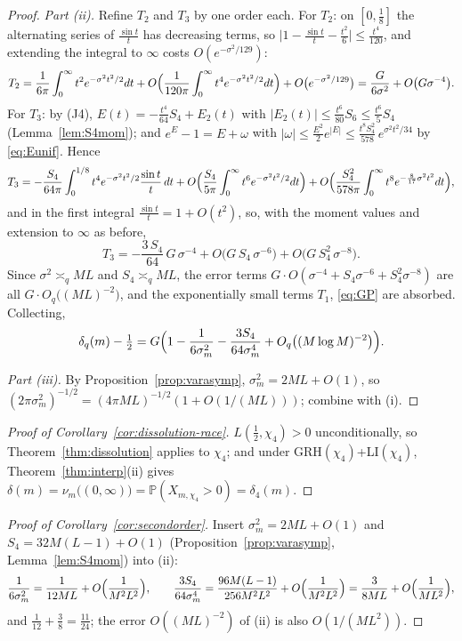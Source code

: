 \documentclass[11pt]{article}
\begin{document}
\begin{proof}
\emph{Part (ii).} Refine $T_2$ and $T_3$ by one order each. For
$T_2$: on $[0,\tfrac18]$ the alternating series of $\frac{\sin t}t$
has decreasing terms, so
$\bigl|1-\frac{\sin t}t-\frac{t^2}6\bigr|\le\frac{t^4}{120}$, and
extending the integral to $\infty$ costs $O(e^{-\sigma^2/129})$:
\[
T_2=\frac1{6\pi}\int_0^{\infty}t^2e^{-\sigma^2t^2/2}dt
+O\Bigl(\frac1{120\pi}\int_0^\infty t^4e^{-\sigma^2t^2/2}dt\Bigr)
+O\bigl(e^{-\sigma^2/129}\bigr)
=\frac{G}{6\sigma^2}+O\bigl(G\sigma^{-4}\bigr).
\]
For $T_3$: by (J4), $E(t)=-\frac{t^4}{64}S_4+E_2(t)$ with
$|E_2(t)|\le\frac{t^6}{80}S_6\le\frac{t^6}{5}S_4$
(Lemma~\ref{lem:S4mom}); and $e^E-1=E+\omega$ with
$|\omega|\le\frac{E^2}2e^{|E|}
\le\frac{t^8S_4^2}{578}\,e^{\sigma^2t^2/34}$ by \eqref{eq:Eunif}.
Hence
\[
T_3=-\frac{S_4}{64\pi}\int_0^{1/8}t^4e^{-\sigma^2t^2/2}
\frac{\sin t}t\,dt
+O\Bigl(\frac{S_4}{5\pi}\int_0^\infty
t^6e^{-\sigma^2t^2/2}dt\Bigr)
+O\Bigl(\frac{S_4^2}{578\pi}\int_0^\infty
t^8e^{-\frac{8}{17}\sigma^2t^2}dt\Bigr),
\]
and in the first integral $\frac{\sin t}t=1+O(t^2)$, so, with the
moment values and extension to $\infty$ as before,
\[
T_3=-\frac{3\,S_4}{64}\,G\,\sigma^{-4}
+O\bigl(G\,S_4\,\sigma^{-6}\bigr)
+O\bigl(G\,S_4^2\,\sigma^{-8}\bigr).
\]
Since $\sigma^2\asymp_qML$ and $S_4\asymp_qML$, the error terms
$G\cdot O(\sigma^{-4}+S_4\sigma^{-6}+S_4^2\sigma^{-8})$ are all
$G\cdot O_q\bigl((ML)^{-2}\bigr)$, and the exponentially small terms
$T_1$, \eqref{eq:GP} are absorbed. Collecting,
\[
\delta_q(m)-\tfrac12
=G\Bigl(1-\frac1{6\sigma_m^2}-\frac{3S_4}{64\sigma_m^4}
+O_q\bigl((M\log M)^{-2}\bigr)\Bigr).
\]

\emph{Part (iii).} By Proposition~\ref{prop:varasymp},
$\sigma_m^2=2ML+O(1)$, so
$(2\pi\sigma_m^2)^{-1/2}=(4\pi ML)^{-1/2}(1+O(1/(ML)))$; combine with
(i).
\end{proof}

\begin{proof}[Proof of Corollary~\ref{cor:dissolution-race}]
$L(\tfrac12,\chi_4)>0$ unconditionally, so
Theorem~\ref{thm:dissolution} applies to $\chi_4$; and under
GRH$(\chi_4)$+LI$(\chi_4)$, Theorem~\ref{thm:interp}(ii) gives
$\delta(m)=\nu_m\bigl((0,\infty)\bigr)=\mathbb P(X_{m,\chi_4}>0)
=\delta_4(m)$.
\end{proof}

\begin{proof}[Proof of Corollary~\ref{cor:secondorder}]
Insert $\sigma_m^2=2ML+O(1)$ and
$S_4=32M(L-1)+O(1)$ (Proposition~\ref{prop:varasymp},
Lemma~\ref{lem:S4mom}) into (ii):
\[
\frac1{6\sigma_m^2}=\frac1{12ML}+O\Bigl(\frac1{M^2L^2}\Bigr),
\qquad
\frac{3S_4}{64\sigma_m^4}
=\frac{96M(L-1)}{256M^2L^2}+O\Bigl(\frac1{M^2L^2}\Bigr)
=\frac{3}{8ML}+O\Bigl(\frac1{ML^2}\Bigr),
\]
and $\frac1{12}+\frac38=\frac{11}{24}$; the error
$O((ML)^{-2})$ of (ii) is also $O(1/(ML^2))$.
\end{proof}
\end{document}
